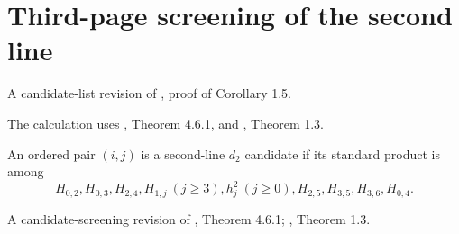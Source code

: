 \section{Third-page screening of the second line}


\begin{theorem}
\label{sem:AdamsCalculations:two-line-d2-screening}
A candidate-list revision of \cite{LWX126}, proof of Corollary 1.5.\par
The calculation uses \cite{Adams60}, Theorem 4.6.1, and \cite{LinExt4}, Theorem 1.3.

An ordered pair $(i,j)$ is a second-line $d_2$ candidate if its standard product is among
\[
 H_{0,2},H_{0,3},H_{2,4},H_{1,j}\ (j\geq3),h_j^2\ (j\geq0),
 H_{2,5},H_{3,5},H_{3,6},H_{0,4}.
\]

A candidate-screening revision of \cite{Adams60}, Theorem 4.6.1; \cite{LinExt4}, Theorem 1.3.\par


\end{theorem}
